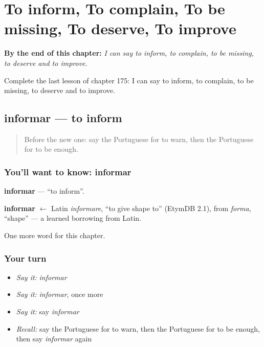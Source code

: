 
\chapter{To inform, To complain, To be missing, To deserve, To improve}
\label{ch:pt-to-inform-to-complain-to-be-missing-to-deserve-to-improve}

\begin{chapteropening}
\textbf{By the end of this chapter:} \emph{I can say to inform, to complain, to be missing, to deserve and to improve.}

Complete the last lesson of chapter 175: I can say to inform, to complain, to be missing, to deserve and to improve.
\end{chapteropening}

\section[informar]{informar — to inform}

\label{lesson:PT-C175-informar}



\begin{quote}
Before the new one: say the Portuguese for to warn, then the Portuguese for to be enough.
\end{quote}

\subsection*{You'll want to know: informar}
\textbf{informar} — \textquotedblleft{}to inform\textquotedblright{}.

\begin{cousinweb}
\textbf{informar} $\leftarrow$ Latin \emph{informare}, \textquotedblleft{}to give shape to\textquotedblright{} (EtymDB 2.1), from \emph{forma}, \textquotedblleft{}shape\textquotedblright{} — a learned borrowing from Latin.
\end{cousinweb}

\begin{grammarlens}[title={What you've built}]
One more word for this chapter.
\end{grammarlens}

\subsection*{Your turn}
\begin{itemize}
\raggedright
  \item \emph{Say it:} \emph{informar}
  \item \emph{Say it:} \emph{informar}, once more
  \item \emph{Say it:} say \emph{informar}
  \item \emph{Recall:} say the Portuguese for to warn, then the Portuguese for to be enough, then say \emph{informar} again
\end{itemize}

